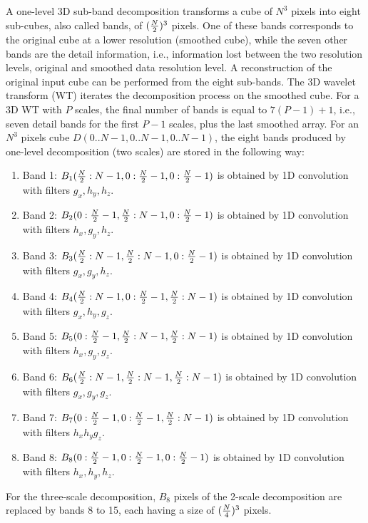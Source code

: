 A one-level 3D sub-band decomposition transforms a cube of $N^3$ pixels into 
eight sub-cubes, also called bands, of  $({N\over 2})^3$ pixels. 
One of these bands corresponds to the original cube at a lower resolution
(smoothed cube), while the seven other bands are the detail 
information, i.e., 
information lost between the two resolution levels, original
and smoothed data resolution level.
A reconstruction of the original input cube can be performed from the 
eight sub-bands. The 3D wavelet transform (WT) iterates the decomposition 
process on the smoothed cube. For a 3D WT with $P$ scales, 
the final number of bands is equal to $7(P-1) + 1$, i.e., seven  
detail bands for the first $P-1$ scales, plus the last smoothed array.
For an $N^3$ pixels cube $D(0..N-1, 0..N-1, 0..N-1)$, the eight bands 
produced by 
one-level decomposition (two scales) are stored in the following way:
\begin{enumerate}
\item Band 1: $B_1({N\over 2}:N-1,0:{N\over 2}-1,0:{N\over 2}-1)$ is obtained
by 1D convolution with filters $ g_x, h_y, h_z$.
\item Band 2: $B_2(0:{N\over 2}-1, {N\over 2}:N-1,0:{N\over 2}-1)$ is obtained
by  1D convolution with filters $ h_x, g_y, h_z$.
\item Band 3: $B_3({N\over 2}:N-1, {N\over 2}:N-1,0:{N\over 2}-1)$ is obtained
by  1D convolution with filters $ g_x, g_y, h_z$.
\item Band 4: $B_4({N\over 2}:N-1,0:{N\over 2}-1, {N\over 2}:N-1)$ is obtained
by  1D convolution with filters $ g_x, h_y, g_z$.
\item Band 5: $B_5(0:{N\over 2}-1, {N\over 2}:N-1,{N\over 2}:N-1)$ is obtained
by  1D convolution with filters $ h_x, g_y, g_z$.
\item Band 6: $B_6({N\over 2}:N-1, {N\over 2}:N-1,{N\over 2}:N-1)$ is obtained
by  1D convolution with filters $ g_x, g_y, g_z$.
\item Band 7: $B_7( 0:{N\over 2}-1, 0:{N\over 2}-1,{N\over 2}:N-1)$ is obtained
by  1D convolution with filters $ h_x h_y g_z $.
\item Band 8: $B_8( 0:{N\over 2}-1, 0:{N\over 2}-1,0:{N\over 2}-1)$ is obtained
by  1D convolution with filters $ h_x, h_y, h_z$.
\end{enumerate}
For the three-scale decomposition, $B_8$ pixels of the 2-scale 
decomposition are replaced by bands 8 to 15, each having a size of 
 $({N\over 4})^3$  pixels.


